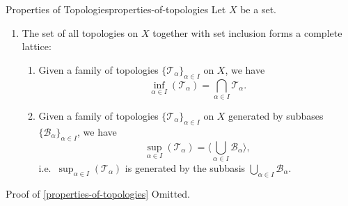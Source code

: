 \begin{proposition}{Properties of Topologies}{properties-of-topologies}%
    Let $X$ be a set.
    \begin{enumerate}
        \item\label{properties-of-topologies-lattice-structure}The set of all topologies on $X$ together with set inclusion forms a complete lattice:
            \begin{enumerate}
                \item\label{properties-of-topologies-lattice-structure-infima}Given a family of topologies $\{\mathcal{T}_{\alpha}\}_{\alpha\in I}$ on $X$, we have
                    \[
                        \inf_{\alpha\in I}(\mathcal{T}_{\alpha})%
                        =%
                        \bigcap_{\alpha\in I}\mathcal{T}_{\alpha}.%
                    \]%
                \item\label{properties-of-topologies-lattice-structure-suprema}Given a family of topologies $\{\mathcal{T}_{\alpha}\}_{\alpha\in I}$ on $X$ generated by subbases $\{\mathcal{B}_{\alpha}\}_{\alpha\in I}$, we have
                    \[
                        \sup_{\alpha\in I}(\mathcal{T}_{\alpha})%
                        =%
                        \langle\bigcup_{\alpha\in I}\mathcal{B}_{\alpha}\rangle,%
                    \]%
                    i.e.\ $\sup_{\alpha\in I}(\mathcal{T}_{\alpha})$ is generated by the subbasis $\bigcup_{\alpha\in I}\mathcal{B}_{\alpha}$.
            \end{enumerate}
    \end{enumerate}
\end{proposition}
\begin{Proof}{Proof of \cref{properties-of-topologies}}%
    Omitted.
\end{Proof}
